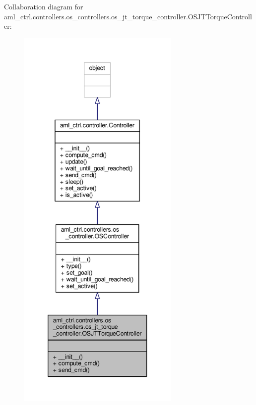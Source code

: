 Collaboration diagram for aml\-\_\-ctrl.\-controllers.\-os\-\_\-controllers.\-os\-\_\-jt\-\_\-torque\-\_\-controller.\-O\-S\-J\-T\-Torque\-Controller\-:
\nopagebreak
\begin{figure}[H]
\begin{center}
\leavevmode
\includegraphics[height=550pt]{classaml__ctrl_1_1controllers_1_1os__controllers_1_1os__jt__torque__controller_1_1_o_s_j_t_torque_controller__coll__graph}
\end{center}
\end{figure}
